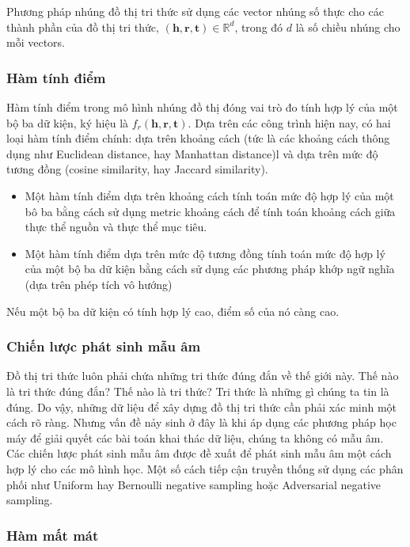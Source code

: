 Phương pháp nhúng đồ thị tri thức sử dụng các vector nhúng số thực cho các thành phần của đồ thị tri thức, $(\mathbf{h}, \mathbf{r}, \mathbf{t}) \in \mathbb{R}^d$, trong đó $d$ là số chiều nhúng cho mỗi vectors.

\subsubsection{Hàm tính điểm}

Hàm tính điểm trong mô hình nhúng đồ thị đóng vai trò đo tính hợp lý của một bộ ba dữ kiện, ký hiệu là $f_r(\mathbf{h}, \mathbf{r}, \mathbf{t})$. Dựa trên các công trình hiện nay, có hai loại hàm tính điểm chính: dựa trên khoảng cách (tức là các khoảng cách thông dụng như Euclidean distance, hay Manhattan distance)l và dựa trên mức độ tương đồng (cosine similarity, hay Jaccard similarity).
\begin{itemize}
    \item Một hàm tính điểm dựa trên khoảng cách tính toán mức độ hợp lý của một bô ba bằng cách sử dụng metric khoảng cách để tính toán khoảng cách giữa thực thể nguồn và thực thể mục tiêu.
    \item Một hàm tính điểm dựa trên mức độ tương đồng tính toán mức độ hợp lý của một bộ ba dữ kiện bằng cách sử dụng các phương pháp khớp ngữ nghĩa (dựa trên phép tích vô hướng)
\end{itemize}

Nếu một bộ ba dữ kiện có tính hợp lý cao, điểm số của nó càng cao.

\subsubsection{Chiến lược phát sinh mẫu âm}

Đồ thị tri thức luôn phải chứa những tri thức đúng đắn về thế giới này. Thế nào là tri thức đúng đắn? Thế nào là tri thức? Tri thức là những gì chúng ta tin là đúng. Do vậy, những dữ liệu để xây dựng đồ thị tri thức cần phải xác minh một cách rõ ràng. Nhưng vấn đề nảy sinh ở đây là khi áp dụng các phương pháp học máy để giải quyết các bài toán khai thác dữ liệu, chúng ta không có mẫu âm. Các chiến lược phát sinh mẫu âm được đề xuất để phát sinh mẫu âm một cách hợp lý cho các mô hình học. Một số cách tiếp cận truyền thống sử dụng các phân phối như Uniform hay Bernoulli negative sampling hoặc Adversarial negative sampling.

\subsubsection{Hàm mất mát}

